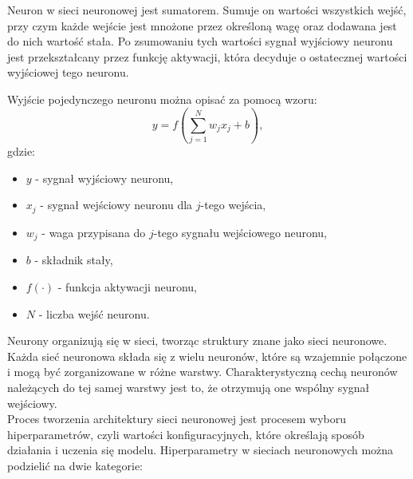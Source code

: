 \documentclass[a4paper,twoside,12pt]{book}
\begin{document}
Neuron w sieci neuronowej jest sumatorem. Sumuje on wartości wszystkich wejść, przy czym każde wejście jest mnożone przez określoną wagę oraz dodawana jest do nich wartość stała. Po zsumowaniu tych wartości sygnał wyjściowy neuronu jest przekształcany przez funkcję aktywacji, która decyduje o ostatecznej wartości wyjściowej tego neuronu.\cite{bib:ksiazka_sieci}

Wyjście pojedynczego neuronu można opisać za pomocą wzoru:
\begin{equation}
  y = f\left(\sum_{j=1}^{N} w_j x_j + b\right),
\end{equation}
gdzie:
\begin{itemize}
  \item \( y \) - sygnał wyjściowy neuronu,
  \item \( x_j \) - sygnał wejściowy neuronu dla \( j \)-tego wejścia,
  \item \( w_j \) - waga przypisana do \( j \)-tego sygnału wejściowego neuronu,
  \item \( b \) - składnik stały,
  \item \( f(\cdot) \) - funkcja aktywacji neuronu,
  \item \( N \) - liczba wejść neuronu.
\end{itemize}

Neurony organizują się w sieci, tworząc struktury znane jako sieci neuronowe. Każda sieć neuronowa składa się z wielu neuronów, które są wzajemnie połączone i mogą być zorganizowane w różne warstwy. Charakterystyczną cechą neuronów należących do tej samej warstwy jest to, że otrzymują one wspólny sygnał wejściowy.\\

Proces tworzenia architektury sieci neuronowej jest procesem wyboru hiperparametrów, czyli wartości konfiguracyjnych, które określają sposób działania i uczenia się modelu. Hiperparametry w sieciach neuronowych można podzielić na dwie kategorie:
\end{document}
